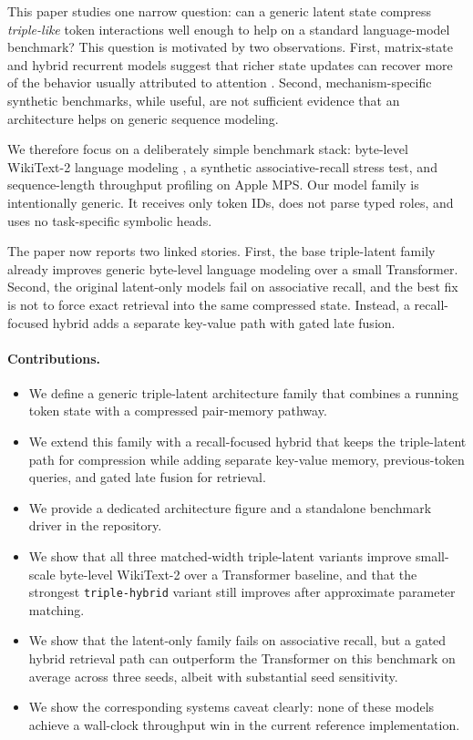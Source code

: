 \documentclass[11pt]{article}
\begin{document}
This paper studies one narrow question: can a generic latent state compress
\emph{triple-like} token interactions well enough to help on a standard
language-model benchmark? This question is motivated by two observations. First,
matrix-state and hybrid recurrent models suggest that richer state updates can
recover more of the behavior usually attributed to attention
\citep{m2rnn2026, eaglefinch2024}. Second, mechanism-specific synthetic
benchmarks, while useful, are not sufficient evidence that an architecture
helps on generic sequence modeling.

We therefore focus on a deliberately simple benchmark stack: byte-level
WikiText-2 language modeling \citep{merity2017pointer}, a synthetic
associative-recall stress test, and sequence-length throughput profiling on
Apple MPS. Our model family is intentionally generic. It receives only token
IDs, does not parse typed roles, and uses no task-specific symbolic heads.

The paper now reports two linked stories. First, the base triple-latent family
already improves generic byte-level language modeling over a small Transformer.
Second, the original latent-only models fail on associative recall, and the
best fix is not to force exact retrieval into the same compressed state.
Instead, a recall-focused hybrid adds a separate key-value path with gated late
fusion.

\paragraph{Contributions.}
\begin{itemize}[leftmargin=1.25em]
  \item We define a generic triple-latent architecture family that combines a
  running token state with a compressed pair-memory pathway.
  \item We extend this family with a recall-focused hybrid that keeps the
  triple-latent path for compression while adding separate key-value memory,
  previous-token queries, and gated late fusion for retrieval.
  \item We provide a dedicated architecture figure and a standalone benchmark
  driver in the repository.
  \item We show that all three matched-width triple-latent variants improve
  small-scale byte-level WikiText-2 over a Transformer baseline, and that the
  strongest \texttt{triple-hybrid} variant still improves after approximate
  parameter matching.
  \item We show that the latent-only family fails on associative recall, but a
  gated hybrid retrieval path can outperform the Transformer on this benchmark
  on average across three seeds, albeit with substantial seed sensitivity.
  \item We show the corresponding systems caveat clearly: none of these models
  achieve a wall-clock throughput win in the current reference implementation.
\end{itemize}
\end{document}
